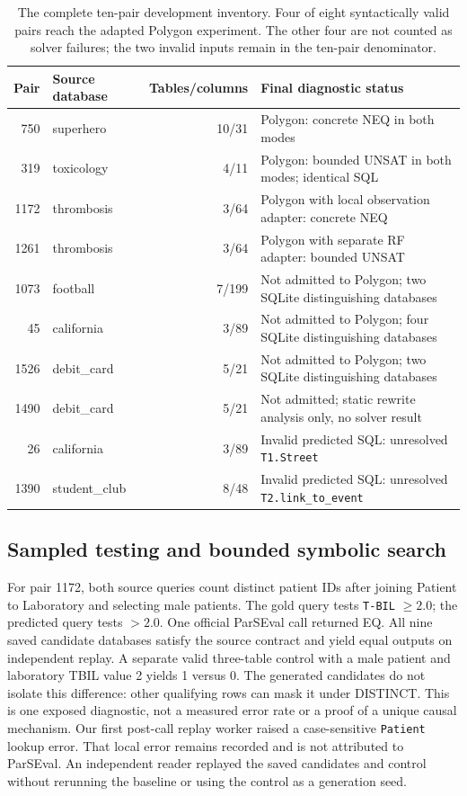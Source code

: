 \begin{table}[htbp]
\centering\small
\begin{tabularx}{\textwidth}{r l r X}
\toprule
Pair & Source database & Tables/columns & Final diagnostic status\\
\midrule
750 & superhero & 10/31 & Polygon: concrete NEQ in both modes\\
319 & toxicology & 4/11 & Polygon: bounded UNSAT in both modes; identical SQL\\
1172 & thrombosis & 3/64 & Polygon with local observation adapter: concrete NEQ\\
1261 & thrombosis & 3/64 & Polygon with separate RF adapter: bounded UNSAT\\
1073 & football & 7/199 & Not admitted to Polygon; two SQLite distinguishing databases\\
45 & california & 3/89 & Not admitted to Polygon; four SQLite distinguishing databases\\
1526 & debit\_card & 5/21 & Not admitted to Polygon; two SQLite distinguishing databases\\
1490 & debit\_card & 5/21 & Not admitted; static rewrite analysis only, no solver result\\
26 & california & 3/89 & Invalid predicted SQL: unresolved \texttt{T1.Street}\\
1390 & student\_club & 8/48 & Invalid predicted SQL: unresolved \texttt{T2.link\_to\_event}\\
\bottomrule
\end{tabularx}
\caption{The complete ten-pair development inventory. Four of eight syntactically valid pairs reach the adapted Polygon experiment. The other four are not counted as solver failures; the two invalid inputs remain in the ten-pair denominator.}\label{tab:natural}
\end{table}

\subsection{Sampled testing and bounded symbolic search}
For pair 1172, both source queries count distinct patient IDs after joining Patient to Laboratory and selecting male patients. The gold query tests \texttt{T-BIL} $\ge 2.0$; the predicted query tests $>2.0$. One official ParSEval call returned EQ. All nine saved candidate databases satisfy the source contract and yield equal outputs on independent replay. A separate valid three-table control with a male patient and laboratory TBIL value 2 yields 1 versus 0. The generated candidates do not isolate this difference: other qualifying rows can mask it under DISTINCT. This is one exposed diagnostic, not a measured error rate or a proof of a unique causal mechanism. Our first post-call replay worker raised a case-sensitive \texttt{Patient} lookup error. That local error remains recorded and is not attributed to ParSEval. An independent reader replayed the saved candidates and control without rerunning the baseline or using the control as a generation seed.

